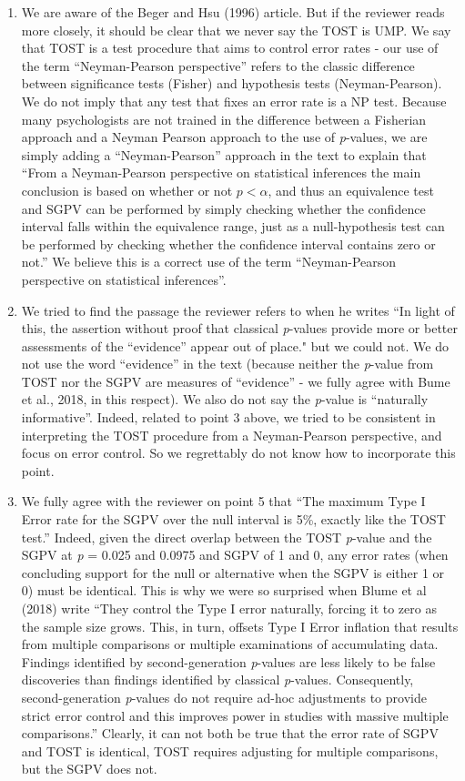 \documentclass[man]{apa6}
\begin{document}
\begin{enumerate}
\def\labelenumi{\arabic{enumi}.}
\setcounter{enumi}{2}
\item
  We are aware of the Beger and Hsu (1996) article. But if the reviewer reads more closely, it should be clear that we never say the TOST is UMP. We say that TOST is a test procedure that aims to control error rates - our use of the term \enquote{Neyman-Pearson perspective} refers to the classic difference between significance tests (Fisher) and hypothesis tests (Neyman-Pearson). We do not imply that any test that fixes an error rate is a NP test. Because many psychologists are not trained in the difference between a Fisherian approach and a Neyman Pearson approach to the use of \emph{p}-values, we are simply adding a \enquote{Neyman-Pearson} approach in the text to explain that \enquote{From a Neyman-Pearson perspective on statistical inferences the main conclusion is based on whether or not \(p < \alpha\), and thus an equivalence test and SGPV can be performed by simply checking whether the confidence interval falls within the equivalence range, just as a null-hypothesis test can be performed by checking whether the confidence interval contains zero or not.} We believe this is a correct use of the term \enquote{Neyman-Pearson perspective on statistical inferences}.
\item
  We tried to find the passage the reviewer refers to when he writes \enquote{In light of this, the assertion without proof that classical \emph{p}-values provide more or better assessments of the ``evidence} appear out of place." but we could not. We do not use the word \enquote{evidence} in the text (because neither the \emph{p}-value from TOST nor the SGPV are measures of \enquote{evidence} - we fully agree with Bume et al., 2018, in this respect). We also do not say the \emph{p}-value is \enquote{naturally informative}. Indeed, related to point 3 above, we tried to be consistent in interpreting the TOST procedure from a Neyman-Pearson perspective, and focus on error control. So we regrettably do not know how to incorporate this point.
\item
  We fully agree with the reviewer on point 5 that \enquote{The maximum Type I Error rate for the SGPV over the null interval is 5\%, exactly like the TOST test.} Indeed, given the direct overlap between the TOST \emph{p}-value and the SGPV at \emph{p} = 0.025 and 0.0975 and SGPV of 1 and 0, any error rates (when concluding support for the null or alternative when the SGPV is either 1 or 0) must be identical. This is why we were so surprised when Blume et al (2018) write \enquote{They control the Type I error naturally, forcing it to zero as the sample size grows. This, in turn, offsets Type I Error inflation that results from multiple comparisons or multiple examinations of accumulating data. Findings identified by second-generation \emph{p}-values are less likely to be false discoveries than findings identified by classical \emph{p}-values. Consequently, second-generation \emph{p}-values do not require ad-hoc adjustments to provide strict error control and this improves power in studies with massive multiple comparisons.} Clearly, it can not both be true that the error rate of SGPV and TOST is identical, TOST requires adjusting for multiple comparisons, but the SGPV does not.

\end{enumerate}
\end{document}
